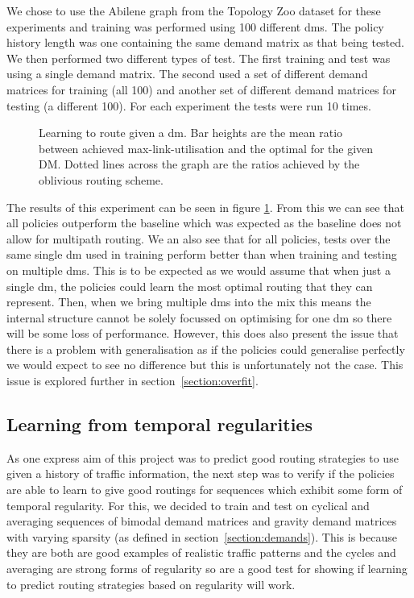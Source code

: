 We chose to use the Abilene graph from the Topology Zoo dataset for these experiments and training was performed using 100 different \acp{dm}. The policy history length was one containing the same demand matrix as that being tested. We then performed two different types of test. The first training and test was using a single demand matrix. The second used a set of different demand matrices for training (all 100) and another set of different demand matrices for testing (a different 100). For each experiment the tests were run 10 times.

\begin{figure}
    \centering
    
    \caption{Learning to route given a \ac{dm}. Bar heights are the mean ratio between achieved max-link-utilisation and the optimal for the given DM. Dotted lines across the graph are the ratios achieved by the oblivious routing scheme.}
    \label{fig:exp_static}
\end{figure}

The results of this experiment can be seen in figure \ref{fig:exp_static}. From this we can see that all policies outperform the baseline which was expected as the baseline does not allow for multipath routing. We an also see that for all policies, tests over the same single \ac{dm} used in training perform better than when training and testing on multiple \acp{dm}. This is to be expected as we would assume that when just a single \ac{dm}, the policies could learn the most optimal routing that they can represent. Then, when we bring multiple \acp{dm} into the mix this means the internal structure cannot be solely focussed on optimising for one \ac{dm} so there will be some loss of performance. However, this does also present the issue that there is a problem with generalisation as if the policies could generalise perfectly we would expect to see no difference but this is unfortunately not the case. This issue is explored further in section~\ref{section:overfit}.


\subsection{Learning from temporal regularities}
As one express aim of this project was to predict good routing strategies to use given a history of traffic information, the next step was to verify if the policies are able to learn to give good routings for sequences which exhibit some form of temporal regularity. For this, we decided to train and test on cyclical and averaging sequences of bimodal demand matrices and gravity demand matrices with varying sparsity (as defined in section~\ref{section:demands}). This is because they are both are good examples of realistic traffic patterns and the cycles and averaging are strong forms of regularity so are a good test for showing if learning to predict routing strategies based on regularity will work.

